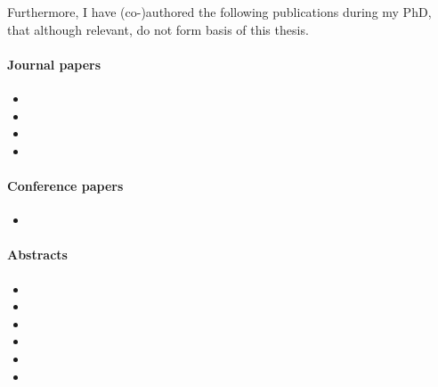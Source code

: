     
    
    Furthermore, I have (co-)authored the following publications during my PhD, that although relevant, do not form basis of this thesis.
    
    \begin{refsection}[ownpubs]
        \paragraph{Journal papers}
            \begin{itemize}
                \item {}
                \item {}
                \item {}
                \item {}
            \end{itemize}
            
        \paragraph{Conference papers}
        \begin{itemize}
            \item {}
        \end{itemize}
        
        \paragraph{Abstracts}
        \begin{itemize}
            \item {}
            \item {}
            \item {}
            \item {}
            \item {}
            \item {}
        \end{itemize}
        
    \end{refsection}
    
